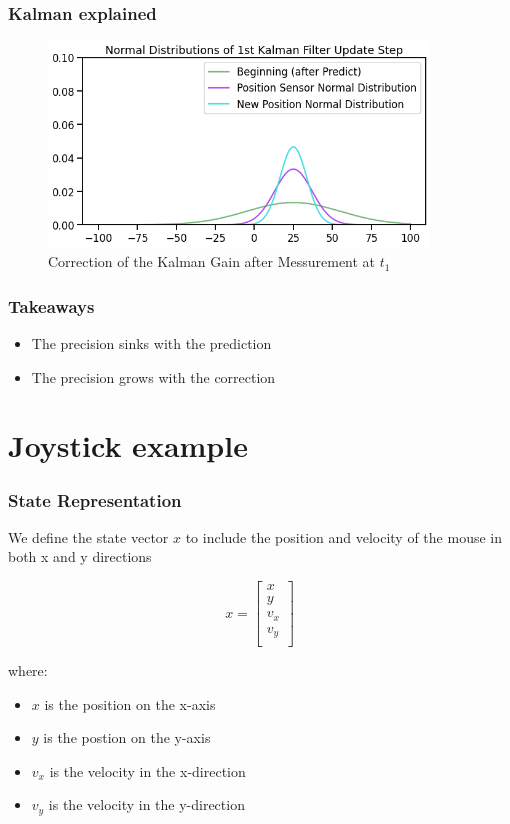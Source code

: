 \documentclass{beamer}
\begin{document}
\begin{frame}
    \frametitle{Kalman explained}
    \begin{figure}
        \centering
        \includegraphics[width=0.9\textwidth]{images/05_correction.png}
        \caption{Correction of the Kalman Gain after Messurement at \(t_1\)}
    \end{figure}
\end{frame}

\begin{frame}
    \frametitle{Takeaways}
    \begin{itemize}
        \item The precision sinks with the prediction
        \item The precision grows with the correction
    \end{itemize}
    
\end{frame}

\section{Joystick example}

\begin{frame}
    \frametitle{State Representation}
    We define the state vector \(x\) to include the position and velocity of the mouse in both x and y directions
   
    \begin{equation*}
        x = \begin{bmatrix}
            x  \\
            y  \\
            v_{x}  \\
            v_{y} \\
        \end{bmatrix}
    \end{equation*}

    where:
    \begin{itemize}
        \item \(x\) is the position on the x-axis
        \item \(y\) is the postion on the y-axis
        \item \(v_{x}\) is the velocity in the x-direction
        \item \(v_{y}\) is the velocity in the y-direction

    \end{itemize}
\end{frame}
\end{document}
